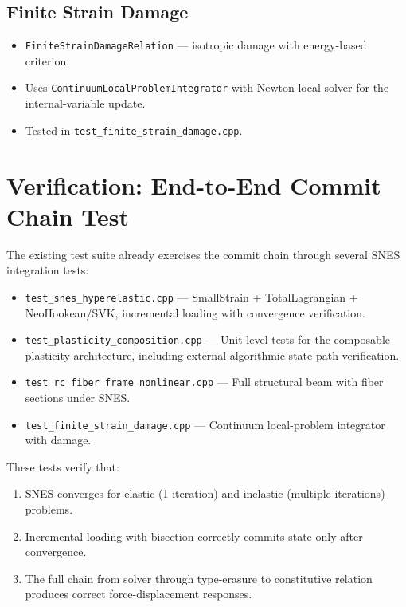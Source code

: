 \subsection{Finite Strain Damage}

\begin{itemize}
  \item \texttt{FiniteStrainDamageRelation} ---
        isotropic damage with energy-based criterion.
  \item Uses \texttt{ContinuumLocalProblemIntegrator} with
        Newton local solver for the internal-variable update.
  \item Tested in \texttt{test\_finite\_strain\_damage.cpp}.
\end{itemize}


\section{Verification: End-to-End Commit Chain Test}
\label{sec:phase1-verification}

The existing test suite already exercises the commit chain
through several SNES integration tests:

\begin{itemize}
  \item \texttt{test\_snes\_hyperelastic.cpp} ---
        SmallStrain + TotalLagrangian + NeoHookean/SVK,
        incremental loading with convergence verification.
  \item \texttt{test\_plasticity\_composition.cpp} ---
        Unit-level tests for the composable plasticity architecture,
        including external-algorithmic-state path verification.
  \item \texttt{test\_rc\_fiber\_frame\_nonlinear.cpp} ---
        Full structural beam with fiber sections under SNES.
  \item \texttt{test\_finite\_strain\_damage.cpp} ---
        Continuum local-problem integrator with damage.
\end{itemize}

These tests verify that:
\begin{enumerate}
  \item SNES converges for elastic (1 iteration) and inelastic
        (multiple iterations) problems.
  \item Incremental loading with bisection correctly commits state
        only after convergence.
  \item The full chain from solver through type-erasure to
        constitutive relation produces correct force-displacement
        responses.
\end{enumerate}


